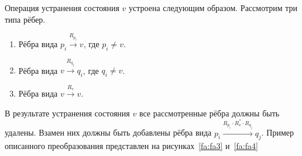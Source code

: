 \begin{marginfigure}
    \begin{center}
    \end{center}
    \caption{Два состояния с параллельными рёбрами}
    \label{fa:fa1}
\end{marginfigure}
\begin{marginfigure}

    \begin{center}
    \end{center}
    \caption{Результат объединения параллельных рёбер для состояний, представленных на рисунке~\ref{fa:fa1}}
    \label{fa:fa2}
\end{marginfigure}

Операция устранения состояния $v$ устроена следующим образом.
Рассмотрим три типа рёбер.
\begin{enumerate}
    \item Рёбра вида $p_i \xrightarrow{R_{p_i}} v$, где $p_i \neq v$.
    \item Рёбра вида $v \xrightarrow{R_{q_j}} q_i$, где $q_i \neq v$.
    \item Рёбра вида $v \xrightarrow{R_v} v$.
\end{enumerate}

В результате устранения состояния $v$ все рассмотренные рёбра должны быть удалены.
Взамен них должны быть добавлены рёбра вида $p_i \xrightarrow{R_{p_i} \cdot R_v^* \cdot R_{q_j}} q_j$.
Пример описанного преобразования представлен на рисунках~\ref{fa:fa3} и~\ref{fa:fa4}

